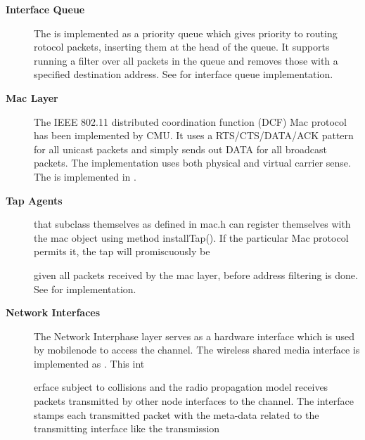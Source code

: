 \begin{description}
\item[{\bf Interface Queue}] The  is implemented as a priority queue which gives priority to routing 
rotocol packets, inserting them at the head of the queue. It supports
running a filter over all packets in the queue and removes those with
a specified destination address. See  for 
interface queue implementation.

\item[{\bf Mac Layer}] The IEEE 802.11 distributed coordination 
function (DCF) Mac protocol has been implemented by CMU. It uses a 
RTS/CTS/DATA/ACK pattern for all unicast packets and simply sends out
 DATA for all broadcast packets. The implementation uses both 
physical and virtual carrier sense. The  is implemented in .

\item[{\bf Tap Agents}]  that subclass themselves as  defined in mac.h can register themselves with the mac object using method installTap(). If the particular Mac protocol permits it, the tap will promiscuously be 











given all packets received by the mac layer, before address filtering is done. See  for  implementation.

\item[{\bf Network Interfaces}] The Network Interphase layer serves as a hardware interface which is used by mobilenode to access the channel. The wireless shared media interface is implemented as . This int











erface subject to collisions and the radio propagation model receives packets transmitted by other node interfaces to the channel. The interface stamps each transmitted packet with the meta-data related to the transmitting interface like the transmission 












\end{description}
